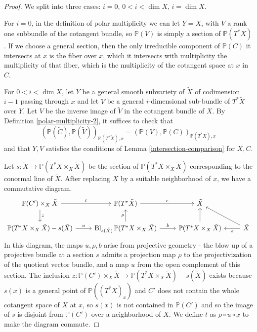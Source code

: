 \documentclass[12pt]{amsart}
\theoremstyle{definition}
\theoremstyle{remark}
\newcommand{\inhyper}[1] {\tilde{#1}}
\begin{document}
\begin{proof} We split into three cases: $i=0$, $0< i < \dim X$, $i=\dim X$.

For $i=0$, in the definition of polar multiplicity we can let $Y =X$, with $V$ a rank one subbundle of the cotangent bundle, so $\mathbb P(V)$ is simply a section of $\mathbb P(T^* X)$. If we choose a general section, then the only irreducible component of $\mathbb P(C)$ it intersects at $x$ is the fiber over $x$, which it intersects with multiplicity the multiplicity of that fiber, which is the multiplicity of the cotangent space at $x$ in $C$.

For $0< i < \dim X$, let $Y$ be a general smooth subvariety of $\inhyper{X}$ of codimension $i-1$ passing through $x$ and let $V$ be a general $i$-dimensional sub-bundle of $T^* \inhyper{X}$ over $Y$. Let $V$ be the inverse image of $\inhyper{V}$ in the cotangent bundle of $X$. By Definition \ref{polar-multiplicity-2}, it suffices to check that \[( \mathbb P( \inhyper{C}), \mathbb P(\inhyper{V}))_{\mathbb P( T^* \inhyper{X}),x}  =(  \mathbb P(V) , \mathbb P(C) )_{\mathbb P(T^* X),x}\] and that $Y,V$ satisfies the conditions of Lemma \ref{intersection-comparison} for $X,C$.

Let $s \colon \inhyper{X} \to  \mathbb P(T^* X \times_X \inhyper{X})$ be the section of $\mathbb P(T^* X \times_X \inhyper{X})$ corresponding to the conormal line of $\inhyper{X}$. After replacing $X$ by a suitable neighborhood of $x$, we have a commutative diagram.
\begin{equation}  \begin{tikzcd}  \mathbb P( C' ) \times_X \tilde{X}  \arrow[d,"z" ]  \arrow[r, "t" ] & \mathbb P ( T^* \tilde{X})  \arrow[r,"e"] & \tilde{X} \\
  \mathbb P(T^*X \times_X \inhyper{X}  ) - s(\inhyper{X}) \arrow[r,"u" ] & \operatorname{Bl}_{ s( \inhyper{X} ) } \mathbb P(T^*X \times_X \inhyper{X}  ) \arrow[u,"\rho"] \arrow[r, "b"] &  \mathbb P(T^*X \times_X \inhyper{X}  )  \arrow[u] & \tilde{X} \arrow[l,"s" ] \arrow[ul] \end{tikzcd} \end{equation}
In this diagram, the maps $u, \rho, b$ arise from projective geometry - the blow up of a projective bundle at a section $s$ admits a projection map $\rho$ to the projectivization of the quotient vector bundle, and a map $u$ from the open complement of this section. The inclusion $z\colon   \mathbb P( C' ) \times_X \tilde{X}  \to \mathbb P(T^*X \times_X \inhyper{X}  ) - s(\inhyper{X}) $ exists because $s(x)$ is a general point of $\mathbb P( (T^*X)_x)$ and $C'$ does not contain the whole cotangent space of $X$ at $x$, so $s(x)$ is not contained in $\mathbb P(C')$ and so the image of $s$ is disjoint from $\mathbb P(C')$ over a neighborhood of $X$. We define $t$ as $\rho\circ u \circ x$ to make the diagram commute. 


\end{proof}
\end{document}
